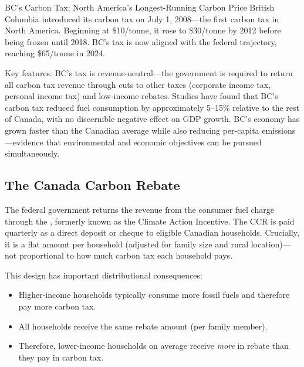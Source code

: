 \begin{canexample}{BC's Carbon Tax: North America's Longest-Running Carbon Price}
British Columbia introduced its carbon tax on July 1, 2008---the first carbon tax in
North America. Beginning at \$10/tonne, it rose to \$30/tonne by 2012 before being
frozen until 2018. BC's tax is now aligned with the federal trajectory, reaching
\$65/tonne in 2024.

Key features: BC's tax is revenue-neutral---the government is required to return all
carbon tax revenue through cuts to other taxes (corporate income tax, personal income tax)
and low-income rebates. Studies have found that BC's carbon tax reduced fuel consumption
by approximately 5--15\% relative to the rest of Canada, with no discernible negative
effect on GDP growth. BC's economy has grown faster than the Canadian average while
also reducing per-capita emissions---evidence that environmental and economic objectives
can be pursued simultaneously.
\end{canexample}

\subsection{The Canada Carbon Rebate}

The federal government returns the revenue from the consumer fuel charge through the , formerly known as the Climate Action Incentive. The CCR is paid quarterly as a direct deposit or cheque to eligible Canadian households. Crucially, it is a flat amount per household (adjusted for family size and rural location)---not proportional to how much carbon tax each household pays.

This design has important distributional consequences:
\begin{itemize}
  \item Higher-income households typically consume more fossil fuels and therefore pay more carbon tax.
  \item All households receive the same rebate amount (per family member).
  \item Therefore, lower-income households on average receive \textit{more} in rebate than they pay in carbon tax.
\end{itemize}

